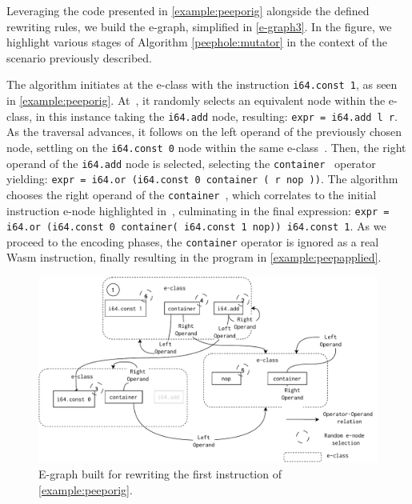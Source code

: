 Leveraging the code presented in \autoref{example:peeporig} alongside the defined rewriting rules, we build the e-graph, simplified in \autoref{e-graph3}.
In the figure, we highlight various stages of Algorithm \ref{peephole:mutator} in the context of the scenario previously described. 



The algorithm initiates at the e-class with the instruction \texttt{i64.const 1}, as seen in \autoref{example:peeporig}.
At~, it randomly selects an equivalent node within the e-class, in this instance taking the \texttt{i64.add} node, resulting: {\texttt{expr = i64.add l r}}.
As the traversal advances, it follows on the left operand of the previously chosen node, settling on the \texttt{i64.const 0} node within the same e-class~.
Then, the right operand of the \texttt{i64.add} node is selected, selecting the \texttt{container}~ operator yielding:
{\texttt{expr = i64.or (i64.const 0 container ( r nop ))}}.
The algorithm chooses the right operand of the \texttt{container}~, which correlates to the initial instruction e-node highlighted in~, culminating in the final expression:
{\texttt{expr = i64.or (i64.const 0 container( i64.const 1 nop))\ i64.const 1}}.
As we proceed to the encoding phases, the \texttt{container} operator is ignored as a real Wasm instruction, finally resulting in the program in \autoref{example:peepapplied}.




\begin{figure}[H]
  \centering
  \includegraphics[width=0.9\linewidth]{figures/e-graph-traversal2.pdf}
  \caption{E-graph built for rewriting the first instruction of \autoref{example:peeporig}. }
\label{e-graph3}
\end{figure}

